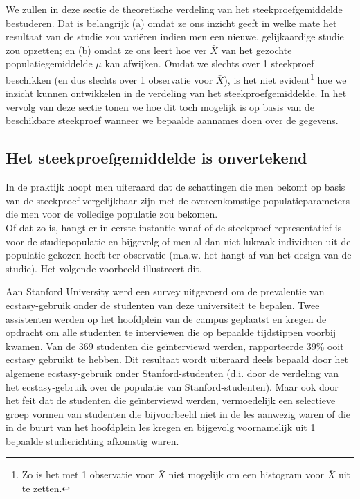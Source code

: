 \documentclass[12pt,dutch,coursenotes]{book}
\let\rmarkdownfootnote\footnote%
\def\footnote{\protect\rmarkdownfootnote}
\theoremstyle{definition}
\theoremstyle{definition}
\theoremstyle{definition}
\theoremstyle{remark}
\let\BeginKnitrBlock\begin \let\EndKnitrBlock\end
\begin{document}
We zullen in deze sectie de theoretische verdeling van het
steekproefgemiddelde bestuderen. Dat is belangrijk (a) omdat ze ons
inzicht geeft in welke mate het resultaat van de studie zou variëren
indien men een nieuwe, gelijkaardige studie zou opzetten; en (b) omdat
ze ons leert hoe ver \(\bar X\) van het gezochte populatiegemiddelde
\(\mu\) kan afwijken. Omdat we slechts over 1 steekproef beschikken (en
dus slechts over 1 observatie voor \(\bar X\)), is het niet
evident\footnote{Zo is het met 1 observatie voor \(\bar X\) niet
  mogelijk om een histogram voor \(\bar X\) uit te zetten.} hoe we
inzicht kunnen ontwikkelen in de verdeling van het steekproefgemiddelde.
In het vervolg van deze sectie tonen we hoe dit toch mogelijk is op
basis van de beschikbare steekproef wanneer we bepaalde aannames doen
over de gegevens.

\subsection{Het steekproefgemiddelde is
onvertekend}\label{het-steekproefgemiddelde-is-onvertekend}

In de praktijk hoopt men uiteraard dat de schattingen die men bekomt op
basis van de steekproef vergelijkbaar zijn met de overeenkomstige
populatieparameters die men voor de volledige populatie zou bekomen.\\
Of dat zo is, hangt er in eerste instantie vanaf of de steekproef
representatief is voor de studiepopulatie en bijgevolg of men al dan
niet lukraak individuen uit de populatie gekozen heeft ter observatie
(m.a.w. het hangt af van het design van de studie). Het volgende
voorbeeld illustreert dit.

\BeginKnitrBlock{example}[Ecstasy]
\protect\hypertarget{exm:unnamed-chunk-64}{}{\label{exm:unnamed-chunk-64}
\iffalse (Ecstasy) \fi{} }
\EndKnitrBlock{example} Aan Stanford University werd een survey
uitgevoerd om de prevalentie van ecstasy-gebruik onder de studenten van
deze universiteit te bepalen. Twee assistenten werden op het hoofdplein
van de campus geplaatst en kregen de opdracht om alle studenten te
interviewen die op bepaalde tijdstippen voorbij kwamen. Van de 369
studenten die geïnterviewd werden, rapporteerde 39\% ooit ecstasy
gebruikt te hebben. Dit resultaat wordt uiteraard deels bepaald door het
algemene ecstasy-gebruik onder Stanford-studenten (d.i. door de
verdeling van het ecstasy-gebruik over de populatie van
Stanford-studenten). Maar ook door het feit dat de studenten die
geïnterviewd werden, vermoedelijk een selectieve groep vormen van
studenten die bijvoorbeeld niet in de les aanwezig waren of die in de
buurt van het hoofdplein les kregen en bijgevolg voornamelijk uit 1
bepaalde studierichting afkomstig waren.
\end{document}
